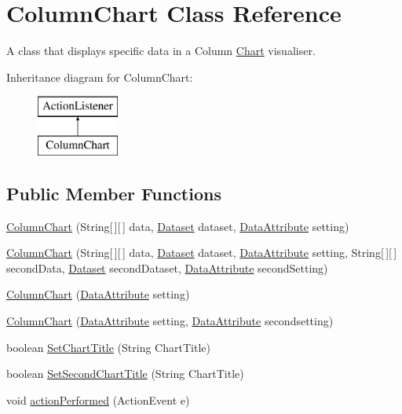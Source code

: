 \hypertarget{class_column_chart}{\section{Column\-Chart Class Reference}
\label{class_column_chart}
}


A class that displays specific data in a Column \hyperlink{interface_chart}{Chart} visualiser.  


Inheritance diagram for Column\-Chart\-:\begin{figure}[H]
\begin{center}
\leavevmode
\includegraphics[height=2.000000cm]{class_column_chart}
\end{center}
\end{figure}
\subsection*{Public Member Functions}
\begin{DoxyCompactItemize}
\item 
\hyperlink{class_column_chart_a4c421ca57f3eb716949c9e5b06507c3c}{Column\-Chart} (String\mbox{[}$\,$\mbox{]}\mbox{[}$\,$\mbox{]} data, \hyperlink{class_dataset}{Dataset} dataset, \hyperlink{class_data_attribute}{Data\-Attribute} setting)
\item 
\hyperlink{class_column_chart_a40f6cc800cef38dde9befc3e24686cc2}{Column\-Chart} (String\mbox{[}$\,$\mbox{]}\mbox{[}$\,$\mbox{]} data, \hyperlink{class_dataset}{Dataset} dataset, \hyperlink{class_data_attribute}{Data\-Attribute} setting, String\mbox{[}$\,$\mbox{]}\mbox{[}$\,$\mbox{]} second\-Data, \hyperlink{class_dataset}{Dataset} second\-Dataset, \hyperlink{class_data_attribute}{Data\-Attribute} second\-Setting)
\item 
\hyperlink{class_column_chart_a8e580c4c64b84f623403bd113d8af320}{Column\-Chart} (\hyperlink{class_data_attribute}{Data\-Attribute} setting)
\item 
\hyperlink{class_column_chart_a6beb1983d5766b94f56c8f91f2a93ef4}{Column\-Chart} (\hyperlink{class_data_attribute}{Data\-Attribute} setting, \hyperlink{class_data_attribute}{Data\-Attribute} secondsetting)
\item 
boolean \hyperlink{class_column_chart_add2a600244d03013679b95eb8f29f09d}{Set\-Chart\-Title} (String Chart\-Title)
\item 
boolean \hyperlink{class_column_chart_a35cb0aa2a3888f2f02fe4994842a5741}{Set\-Second\-Chart\-Title} (String Chart\-Title)
\item 
void \hyperlink{class_column_chart_aae904321080912d1df80692320b583b5}{action\-Performed} (Action\-Event e)
\end{DoxyCompactItemize}

